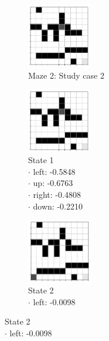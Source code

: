 \documentclass[a4paper]{article}    %
\begin{document}
\begin{figure}[H]
    \centering
    \begin{subfigure}{0.24\textwidth}
        \centering
        \includegraphics[width=2.8cm]{maze2-case2-state1}
        \caption{Maze 2: Study case 2 \vspace{12mm}}
        \label{fig:maze2-case2-states}
    \end{subfigure}
    \hfill
    \centering
    \begin{subfigure}{0.24\textwidth}
        \centering
        \includegraphics[width=2.8cm]{maze2-case2-state1}
        \caption{State 1 \\
            \scriptsize
            \hspace*{5mm} $\boldsymbol{\cdot}$ left:  -0.5848 \\
            \hspace*{5mm} $\boldsymbol{\cdot}$ up:    -0.6763 \\
            \hspace*{5mm} $\boldsymbol{\cdot}$ right: -0.4808 \\
            \hspace*{5mm} $\boldsymbol{\cdot}$ down:  -0.2210 }
        \label{fig:maze2-case2-state1}
    \end{subfigure}
    \hfill
    \begin{subfigure}{0.24\textwidth}
        \centering
        \includegraphics[width=2.8cm]{maze2-case2-state2}
        \caption{State 2 \\
            \scriptsize
            \hspace*{5mm} $\boldsymbol{\cdot}$ left:  -0.0098 \\
}
\end{subfigure}
\end{figure}
\end{document}
